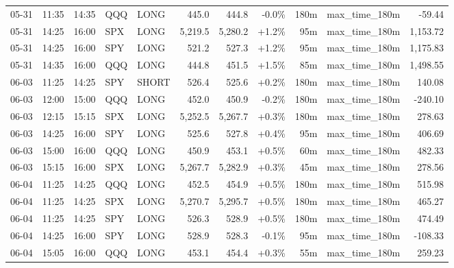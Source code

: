 \documentclass[11pt,a4paper,twoside]{article}
\begin{document}
\begin{center}
\begin{longtable}{>{\color{txtmain}}l l l l l r r r r >{\color{txtmain}}l r}
05-31 & 11:35 & 14:35 & QQQ & LONG & 445.0 & 444.8 & \textcolor{lossred}{-0.0\%} & 180m & max\_time\_180m & \textcolor{lossred}{-59.44} \\
05-31 & 14:25 & 16:00 & SPX & LONG & 5,219.5 & 5,280.2 & \textcolor{wingreen}{+1.2\%} & 95m & max\_time\_180m & \textcolor{wingreen}{1,153.72} \\
05-31 & 14:25 & 16:00 & SPY & LONG & 521.2 & 527.3 & \textcolor{wingreen}{+1.2\%} & 95m & max\_time\_180m & \textcolor{wingreen}{1,175.83} \\
05-31 & 14:35 & 16:00 & QQQ & LONG & 444.8 & 451.5 & \textcolor{wingreen}{+1.5\%} & 85m & max\_time\_180m & \textcolor{wingreen}{1,498.55} \\
06-03 & 11:25 & 14:25 & SPY & SHORT & 526.4 & 525.6 & \textcolor{wingreen}{+0.2\%} & 180m & max\_time\_180m & \textcolor{wingreen}{140.08} \\
06-03 & 12:00 & 15:00 & QQQ & LONG & 452.0 & 450.9 & \textcolor{lossred}{-0.2\%} & 180m & max\_time\_180m & \textcolor{lossred}{-240.10} \\
06-03 & 12:15 & 15:15 & SPX & LONG & 5,252.5 & 5,267.7 & \textcolor{wingreen}{+0.3\%} & 180m & max\_time\_180m & \textcolor{wingreen}{278.63} \\
06-03 & 14:25 & 16:00 & SPY & LONG & 525.6 & 527.8 & \textcolor{wingreen}{+0.4\%} & 95m & max\_time\_180m & \textcolor{wingreen}{406.69} \\
06-03 & 15:00 & 16:00 & QQQ & LONG & 450.9 & 453.1 & \textcolor{wingreen}{+0.5\%} & 60m & max\_time\_180m & \textcolor{wingreen}{482.33} \\
06-03 & 15:15 & 16:00 & SPX & LONG & 5,267.7 & 5,282.9 & \textcolor{wingreen}{+0.3\%} & 45m & max\_time\_180m & \textcolor{wingreen}{278.56} \\
06-04 & 11:25 & 14:25 & QQQ & LONG & 452.5 & 454.9 & \textcolor{wingreen}{+0.5\%} & 180m & max\_time\_180m & \textcolor{wingreen}{515.98} \\
06-04 & 11:25 & 14:25 & SPX & LONG & 5,270.7 & 5,295.7 & \textcolor{wingreen}{+0.5\%} & 180m & max\_time\_180m & \textcolor{wingreen}{465.27} \\
06-04 & 11:25 & 14:25 & SPY & LONG & 526.3 & 528.9 & \textcolor{wingreen}{+0.5\%} & 180m & max\_time\_180m & \textcolor{wingreen}{474.49} \\
06-04 & 14:25 & 16:00 & SPY & LONG & 528.9 & 528.3 & \textcolor{lossred}{-0.1\%} & 95m & max\_time\_180m & \textcolor{lossred}{-108.33} \\
06-04 & 15:05 & 16:00 & QQQ & LONG & 453.1 & 454.4 & \textcolor{wingreen}{+0.3\%} & 55m & max\_time\_180m & \textcolor{wingreen}{259.23} \\

\end{longtable}
\end{center}
\end{document}
